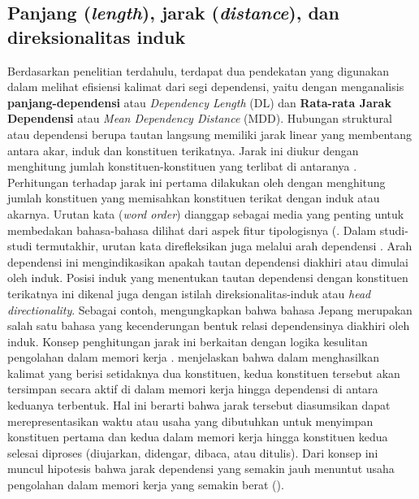 \subsection{Panjang (\textit{length}), jarak (\textit{distance}), dan direksionalitas induk}

Berdasarkan penelitian terdahulu, terdapat dua pendekatan yang digunakan dalam melihat efisiensi kalimat dari segi dependensi, yaitu dengan menganalisis \textbf{\Gls{panjang-dependensi}} atau \textit{Dependency Length} (DL) dan \textbf{Rata-rata Jarak Dependensi} atau \textit{Mean Dependency Distance} (MDD).  Hubungan struktural atau dependensi berupa tautan langsung memiliki jarak linear yang membentang antara akar, induk dan konstituen terikatnya. Jarak ini diukur dengan menghitung jumlah konstituen-konstituen yang terlibat di antaranya \citep{heringer1980syntax}. Perhitungan terhadap jarak ini pertama dilakukan oleh \cite{heringer1980syntax} dengan menghitung jumlah konstituen yang memisahkan konstituen terikat dengan induk atau akarnya. Urutan kata (\textit{word order}) dianggap sebagai media yang penting untuk membedakan bahasa-bahasa dilihat dari aspek fitur tipologisnya (\citealp{greenberg1963some, dryer1992greenbergian}. Dalam studi-studi termutakhir, urutan kata direfleksikan juga melalui arah dependensi \citep{hudson2007language}. Arah dependensi ini mengindikasikan apakah tautan dependensi diakhiri atau dimulai oleh induk. Posisi induk yang menentukan tautan dependensi dengan konstituen terikatnya ini dikenal juga dengan istilah \gls{direksionalitas-induk} atau \textit{head directionality}. Sebagai contoh, \cite{hudson2003psychological} mengungkapkan bahwa bahasa Jepang merupakan salah satu bahasa yang kecenderungan bentuk relasi dependensinya diakhiri oleh induk. Konsep penghitungan jarak ini berkaitan dengan logika kesulitan pengolahan dalam memori kerja \citep{hudson2007language}. \cite{hudson2007language} menjelaskan bahwa dalam menghasilkan kalimat yang berisi setidaknya dua konstituen, kedua konstituen tersebut akan tersimpan secara aktif di dalam memori kerja hingga dependensi di antara keduanya terbentuk. Hal ini berarti bahwa jarak tersebut diasumsikan dapat merepresentasikan waktu atau usaha yang dibutuhkan untuk menyimpan konstituen pertama dan kedua dalam memori kerja hingga konstituen kedua selesai diproses (diujarkan, didengar, dibaca, atau ditulis). Dari konsep ini muncul hipotesis bahwa jarak dependensi yang semakin jauh menuntut usaha pengolahan dalam memori kerja yang semakin berat (\citealp{hudson2007language, gibson1998linguistic}).

